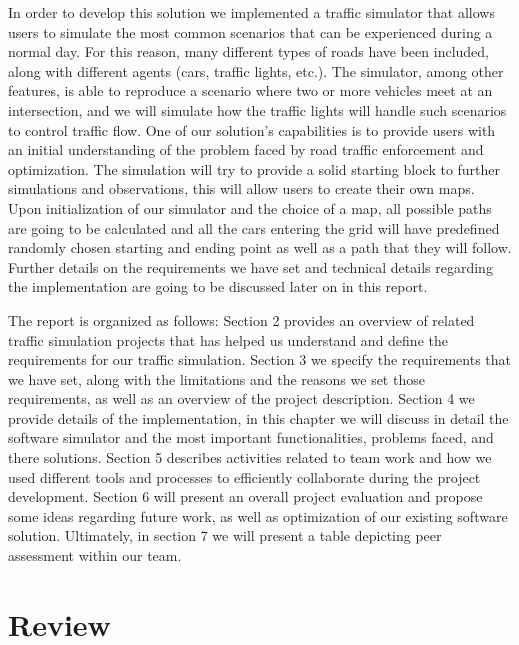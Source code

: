 \documentclass[oneside]{article}
\begin{document}
\noindent In order to develop this solution we implemented a traffic simulator that allows users to simulate the most common scenarios that can be experienced during a normal day. For this reason, many different types of roads have been included, along with different agents (cars, traffic lights, etc.). The simulator, among other features, is able to reproduce a scenario where two or more vehicles meet at an intersection, and we will simulate how the traffic lights will handle such scenarios to control traffic flow. One of our solution's capabilities is to provide users with an initial understanding of the problem faced by road traffic enforcement and optimization. The simulation will try to provide a solid starting block to further simulations and observations, this will allow users to create their own maps. Upon initialization of our simulator and the choice of a map, all possible paths are going to be calculated and all the cars entering the grid will have predefined randomly chosen starting and ending point as well as a path that they will follow. Further details on the requirements we have set and technical details regarding the implementation are going to be discussed later on in this report.
\newline

\noindent The report is organized as follows: Section 2 provides an overview of related traffic simulation projects that has helped us understand and define the requirements for our traffic simulation. Section 3 we specify the requirements that we have set, along with the limitations and the reasons we set those requirements, as well as an overview of the project description. Section 4 we provide details of the implementation, in this chapter we will discuss in detail the software simulator and the most important functionalities, problems faced, and there solutions. Section 5 describes activities related to team work and how we used different tools and processes to efficiently collaborate during the project development. Section 6 will present an overall project evaluation and propose some ideas regarding future work, as well as optimization of our existing software solution. Ultimately, in section 7 we will present a table depicting peer assessment within our team.
\newpage

\section{Review}
\end{document}
